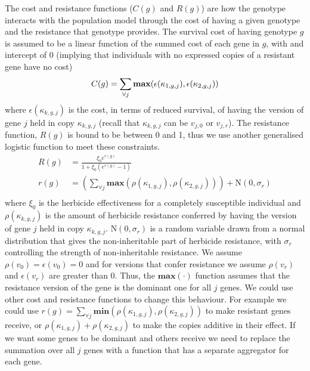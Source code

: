 \documentclass[12pt, a4paper]{article}
\begin{document}
The cost and resistance functions ($C(g)$ and $R(g)$) are how the genotype interacts with the population model through the cost of having a given genotype and the resistance that genotype provides. The survival cost of having genotype $g$ is assumed to be a linear function of the summed cost of each gene in $g$, with and intercept of 0 (implying that individuals with no expressed copies of a resistant gene have no cost)                
\begin{equation}
	\displaystyle
	\label{eq:cost_funct}	
	C(g) = \sum_{\forall j} \textbf{max}(\epsilon(\kappa_{1,g,j}), \epsilon(\kappa_{2,g,j}))\\
\end{equation}
where $\epsilon(\kappa_{k,g,j})$ is the cost, in terms of reduced survival, of having the version of gene $j$ held in copy $\kappa_{k,g,j}$ (recall that $\kappa_{k,g,j}$ can be $v_{j,0}$ or $v_{j,r}$). The resistance function, $R(g)$ is bound to be between 0 and 1, thus we use another generalised logistic function to meet these constraints.    
\begin{subequations} \label{eq:herb_attack}
\begin{align}
	\displaystyle
	\label{eq:herb_attack_logit} 
	R(g) &= \frac{\xi_0 e^{r(g)}}{1 + \xi_0 (e^{r(g)} - 1)} \\
	\label{eq:resist_score}
	r(g) &= \left(\sum_{\forall j} \textbf{max}(\rho(\kappa_{1,g,j}), \rho(\kappa_{2,g,j}))\right) + \text{N}(0, \sigma_r) \\
\end{align} 
\end{subequations} 
where $\xi_0$ is the herbicide effectiveness for a completely susceptible individual and $\rho(\kappa_{k,g,j})$ is the amount of herbicide resistance conferred by having the version of gene $j$ held in copy $\kappa_{k,g,j}$. $\text{N}(0, \sigma_r)$ is a random variable drawn from a normal distribution that gives the non-inheritable part of herbicide resistance, with $\sigma_r$ controlling the strength of non-inheritable resistance. We assume $\rho(v_0) = \epsilon(v_0) = 0$ and for versions that confer resistance we assume $\rho(v_r)$ and $\epsilon(v_r)$ are greater than 0. Thus, the $\textbf{max}({\cdot})$ function assumes that the resistance version of the gene is the dominant one for all $j$ genes. We could use other cost and resistance functions to change this behaviour. For example we could use $r(g) = \sum_{\forall j} \textbf{min}(\rho(\kappa_{1,g,j}), \rho(\kappa_{2,g,j}))$ to make resistant genes receive, or $\rho(\kappa_{1,g,j}) + \rho(\kappa_{2,g,j})$ to make the copies additive in their effect. If we want some genes to be dominant and others receive we need to replace the summation over all $j$ genes with a function that has a separate aggregator for each gene.             
\end{document}
